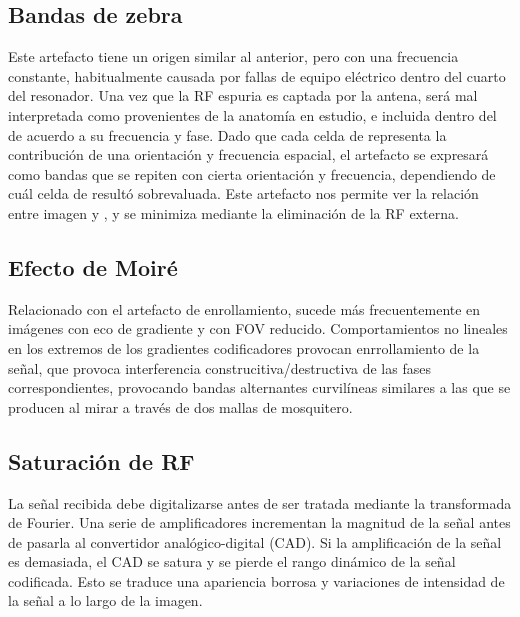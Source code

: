 \subsection{Bandas de zebra}
Este artefacto tiene un origen similar al anterior, pero con una frecuencia constante, habitualmente causada por fallas de equipo eléctrico dentro del cuarto del resonador. Una vez que la RF espuria es captada por la antena, será mal interpretada como provenientes de la anatomía en estudio, e incluida dentro del \espaciok de acuerdo a su frecuencia y fase.  Dado que cada celda de \espaciok representa la contribución de una orientación y frecuencia espacial, el artefacto se expresará como bandas que se repiten con cierta orientación y frecuencia, dependiendo de cuál celda de \espaciok resultó sobrevaluada. Este artefacto nos permite ver la relación entre imagen y \espaciok, y se minimiza mediante la eliminación de la RF externa. 


\subsection{Efecto de Moiré}
Relacionado con el artefacto de enrollamiento, sucede más frecuentemente en imágenes con eco de gradiente y con FOV reducido. Comportamientos no lineales en los extremos de los gradientes codificadores provocan enrrollamiento de la señal, que provoca interferencia construcitiva/destructiva de las fases correspondientes, provocando bandas alternantes curvilíneas similares a las que se producen al mirar a través de dos mallas de mosquitero. 

\subsection{Saturación de RF}
La señal recibida debe digitalizarse antes de ser tratada mediante la transformada de Fourier. Una serie de amplificadores incrementan la magnitud de la señal antes de pasarla al convertidor analógico-digital (CAD). Si la amplificación de la señal es demasiada, el CAD se satura y se pierde el rango dinámico de la señal codificada. Esto se traduce una apariencia borrosa y variaciones de intensidad de la señal a lo largo de la imagen.

